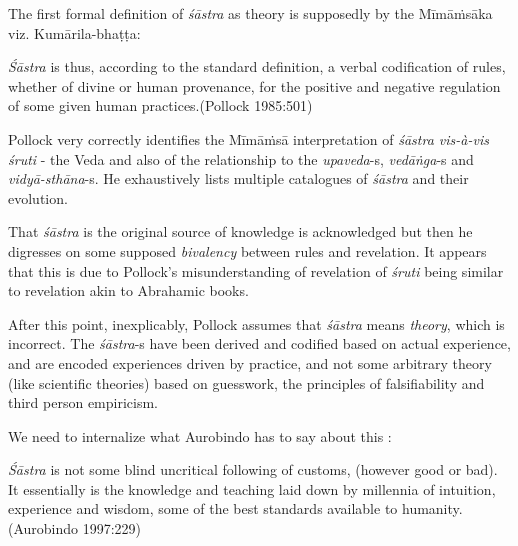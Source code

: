 The first formal definition of {\sl śāstra} as theory is supposedly by the Mīmāṁsāka viz. Kumārila-bhaṭṭa:

\begin{myquote}
{{\sl Śāstra}} is thus, according to the standard definition, a verbal codification of rules, whether of divine or human provenance, for the positive and negative regulation of some given human practices.\hfill (Pollock 1985:501)
\end{myquote}

Pollock very correctly identifies the Mīmāṁsā interpretation of {\sl śāstra vis-à-vis śruti} - the Veda and also of the relationship to the {\sl upaveda}-s, {\sl vedāṅga}-s and  {\sl vidyā-sthāna}-s. He exhaustively lists multiple catalogues of {\sl śāstra} and their evolution.

That {\sl śāstra} is the original source of knowledge is acknowledged but then he digresses on some supposed {\sl bivalency} between rules and revelation. It appears that this is due to Pollock's misunderstanding of revelation of {\sl śruti} being similar to revelation akin to Abrahamic books.

After this point, inexplicably, Pollock assumes that {\sl śāstra} means {\sl theory}, which is incorrect. The {\sl śāstra}-s have been derived and codified based on actual experience, and are encoded experiences driven by practice, and not some arbitrary theory (like scientific theories) based on guesswork, the principles of falsifiability and third person empiricism.

We need to internalize what Aurobindo has to say about this :
\begin{myquote}
{{\sl Śāstra}} is not some blind uncritical following of customs, (however good or bad). It essentially is the knowledge and teaching laid down by millennia of intuition, experience and wisdom, some of the best standards available to humanity.\hfill (Aurobindo 1997:229)
\end{myquote}


